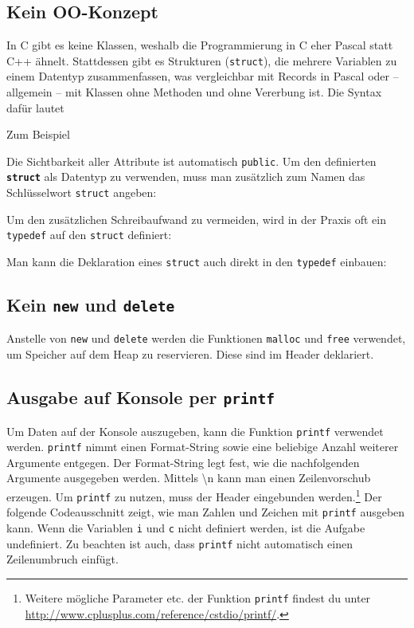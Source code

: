 \subsection{Kein OO-Konzept}
In C gibt es keine Klassen, weshalb die Programmierung in C eher Pascal statt C++ ähnelt.
Stattdessen gibt es Strukturen (\lstinline{struct}), die mehrere Variablen zu einem Datentyp zusammenfassen, was vergleichbar mit Records in Pascal oder -- allgemein -- mit Klassen ohne Methoden und ohne Vererbung ist.
%
Die Syntax dafür lautet
%
  
%
Zum Beispiel
%
  
%
Die Sichtbarkeit aller Attribute ist automatisch \lstinline{public}.
%
Um den definierten \textbf{\lstinline|struct|} als Datentyp zu verwenden, muss man zusätzlich zum Namen das Schlüsselwort \lstinline{struct} angeben:
%
  
%
Um den zusätzlichen Schreibaufwand zu vermeiden, wird in der Praxis oft ein \lstinline{typedef} auf den \lstinline{struct} definiert:
%
  
%
Man kann die Deklaration eines \lstinline{struct} auch direkt in den \lstinline{typedef} einbauen:
%
  

\subsection{Kein \lstinline{new} und \lstinline{delete}}

Anstelle von \lstinline{new} und \lstinline{delete} werden die Funktionen \lstinline{malloc} und \lstinline{free} verwendet, um Speicher auf dem Heap zu reservieren.
Diese sind im Header  deklariert.

  

\subsection{Ausgabe auf Konsole per \lstinline{printf}}

Um Daten auf der Konsole auszugeben, kann die Funktion \lstinline{printf} verwendet werden.
\lstinline{printf} nimmt einen Format-String sowie eine beliebige Anzahl weiterer Argumente entgegen.
Der Format-String legt fest, wie die nachfolgenden Argumente ausgegeben werden.
Mittels \textbackslash n kann man einen Zeilenvorschub erzeugen. Um \lstinline{printf} zu nutzen, muss der Header  eingebunden werden.\footnote{Weitere mögliche Parameter etc. der Funktion \lstinline{printf} findest du unter \url{http://www.cplusplus.com/reference/cstdio/printf/}.}
Der folgende Codeausschnitt zeigt, wie man Zahlen und Zeichen mit \lstinline|printf| ausgeben kann.
Wenn die Variablen \lstinline|i| und \lstinline|c| nicht definiert werden, ist die Aufgabe undefiniert.
Zu beachten ist auch, dass \lstinline|printf| nicht automatisch einen Zeilenumbruch einfügt.
%
  


